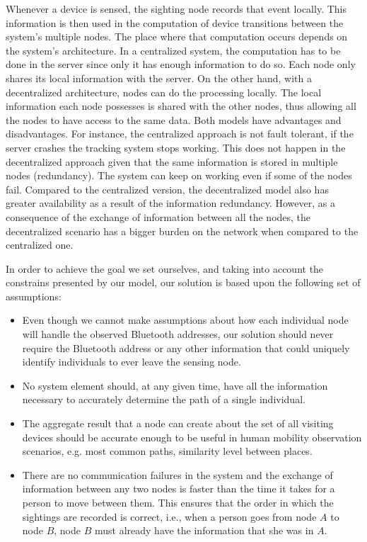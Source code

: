 Whenever a device is sensed, the sighting node records that event
locally. This information is then used in the computation of device
transitions between the system's multiple nodes. The place where that
computation occurs depends on the system's architecture. In a
centralized system, the computation has to be done in the server since
only it has enough information to do so. Each node only shares its
local information with the server. On the other hand, with a
decentralized architecture, nodes can do the processing locally. The
local information each node possesses is shared with the other nodes,
thus allowing all the nodes to have access to the same data. Both
models have advantages and disadvantages. For instance, the
centralized approach is not fault tolerant, if the server crashes the
tracking system stops working. This does not happen in the
decentralized approach given that the same information is stored in
multiple nodes (redundancy). The system can keep on working even if
some of the nodes fail. Compared to the centralized version, the
decentralized model also has greater availability as a result of the
information redundancy. However, as a consequence of the exchange of
information between all the nodes, the decentralized scenario has a
bigger burden on the network when compared to the centralized one.


In order to achieve the goal we set ourselves, and taking into account
the constrains presented by our model, our solution is based upon the
following set of assumptions:
\begin{itemize}
\item Even though we cannot make assumptions about how each individual
  node will handle the observed Bluetooth addresses, our solution
  should never require the Bluetooth address or any other information
  that could uniquely identify individuals to ever leave the sensing
  node.
\item No system element should, at any given time, have all the
  information necessary to accurately determine the path of a single
  individual.
\item The aggregate result that a node can create about the set of all
  visiting devices should be accurate enough to be useful in human
  mobility observation scenarios, e.g. most common paths, similarity
  level between places.
\item There are no communication failures in the system and the
  exchange of information between any two nodes is faster than the
  time it takes for a person to move between them. This ensures that
  the order in which the sightings are recorded is correct, i.e., when
  a person goes from node $A$ to node $B$, node $B$ must already
  have the information that she was in $A$.
\end{itemize}


